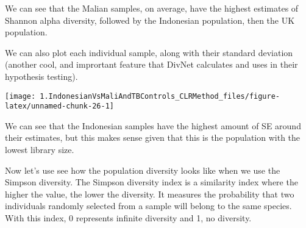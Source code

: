 \documentclass[]{article}
\newenvironment{Shaded}{\begin{snugshade}}{\end{snugshade}}
\newcommand{\DataTypeTok}[1]{\textcolor[rgb]{0.13,0.29,0.53}{#1}}
\newcommand{\KeywordTok}[1]{\textcolor[rgb]{0.13,0.29,0.53}{\textbf{#1}}}
\newcommand{\NormalTok}[1]{#1}
\newcommand{\OperatorTok}[1]{\textcolor[rgb]{0.81,0.36,0.00}{\textbf{#1}}}
\newcommand{\StringTok}[1]{\textcolor[rgb]{0.31,0.60,0.02}{#1}}
\begin{document}
We can see that the Malian samples, on average, have the highest
estimates of Shannon alpha diversity, followed by the Indonesian
population, then the UK population.

We can also plot each individual sample, along with their standard
deviation (another cool, and imprortant feature that DivNet calculates
and uses in their hypothesis testing).

\begin{Shaded}
\end{Shaded}

\begin{center}\texttt{[image: 1.IndonesianVsMaliAndTBControls\_CLRMethod\_files/figure-latex/unnamed-chunk-26-1]} \end{center}

We can see that the Indonesian samples have the highest amount of SE
around their estimates, but this makes sense given that this is the
population with the lowest library size.

Now let's use see how the population diversity looks like when we use
the Simpson diversity. The Simpson diversity index is a similarity index
where the higher the value, the lower the diversity. It measures the
probability that two individuals randomly selected from a sample will
belong to the same species. With this index, 0 represents infinite
diversity and 1, no diversity.
\end{document}
